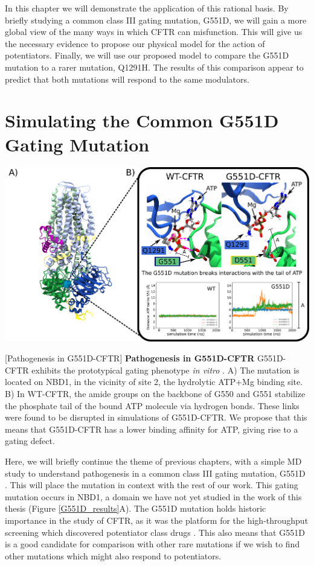 In this chapter we will demonstrate the application of this rational basis. By briefly studying a common class III gating mutation, G551D, we will gain a more global view of the many ways in which CFTR can misfunction. This will give us the necessary evidence to propose our physical model for the action of potentiators. Finally, we will use our proposed model to compare the G551D mutation to a rarer mutation, Q1291H. The results of this comparison appear to predict that both mutations will respond to the same modulators. 

\section{Simulating the Common G551D Gating Mutation}

	\begin{center}
		\includegraphics[width=\textwidth]{figures/perspective/G551D.pdf}
	\end{center}

\begingroup
\captionsetup{singlelinecheck = false, justification=raggedright}
[Pathogenesis in G551D-CFTR] {\textbf{Pathogenesis in G551D-CFTR}}{ G551D-CFTR exhibits the prototypical gating phenotype \textit{in vitro} \cite{bompadre2007, wang2020}. A) The mutation is located on NBD1, in the vicinity of site 2, the hydrolytic ATP+Mg binding site. B) In WT-CFTR, the amide groups on the backbone of G550 and G551 stabilize the phosphate tail of the bound ATP molecule via hydrogen bonds. These links were found to be disrupted in simulations of G551D-CFTR. We propose that this means that G551D-CFTR has a lower binding affinity for ATP, giving rise to a gating defect.} 
\label{G551D_results}
\endgroup

Here, we will briefly continue the theme of previous chapters, with a simple MD study to understand pathogenesis in a common class III gating mutation, G551D \cite{li1996}. This will place the mutation in context with the rest of our work. This gating mutation occurs in NBD1, a domain we have not yet studied in the work of this thesis (Figure \ref{G551D_results}A). The G551D mutation holds historic importance in the study of CFTR, as it was the platform for the high-throughput screening which discovered potentiator class drugs \cite{vangoor2009}. This also means that G551D is a good candidate for comparison with other rare mutations if we wish to find other mutations which might also respond to potentiators.

